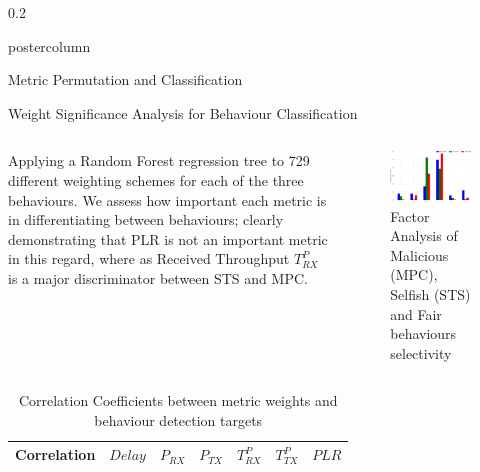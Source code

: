 \documentclass[final,hyperref={pdfpagelabels=false}]{beamer}
\def\colwidth{0.2\linewidth}
\begin{document}
\begin{frame}[fragile]
\begin{columns}[T]
\begin{column}{\colwidth}
\begin{beamercolorbox}[center,wd=\textwidth]{postercolumn}
\begin{minipage}[T]{.98\textwidth}
{\begin{block}{Metric Permutation and Classification}
						\end{block}						
						\begin{block}{Weight Significance Analysis for Behaviour Classification}
							\begin{columns}[T]
								\begin{column}{0.416\textwidth}
								Applying a Random Forest regression tree to 729 different weighting schemes for each of the three behaviours. We assess how important each metric is in differentiating between behaviours; clearly demonstrating that PLR is not an important metric in this regard, where as Received Throughput $T_{RX}^P$ is a major discriminator between STS and MPC.
								\end{column}
								\begin{column}{0.56\textwidth}
								\begin{figure}
									\centering
									\includegraphics[width=\linewidth]{MaliciousSelfishMetricFactors}
									\caption{Factor Analysis of Malicious (MPC), Selfish (STS) and Fair behaviours selectivity}
									\label{fig:malselfactors}
								\end{figure}
							\end{column}
							\end{columns}
							\begin{table}[h]
								\caption{Correlation Coefficients between metric weights and behaviour detection targets} \label{tab:correlations}
								\begin{center}
									\begin{tabular}{lcccccc}
										\toprule
										Correlation      & $Delay$ & $P_{RX}$ & $P_{TX}$ & $T^P_{RX}$ & $T^P_{TX}$ & $PLR$ \\
										\midrule

\end{tabular}
\end{center}
\end{table}
\end{block}}
\end{minipage}
\end{beamercolorbox}
\end{column}
\end{columns}
\end{frame}
\end{document}
